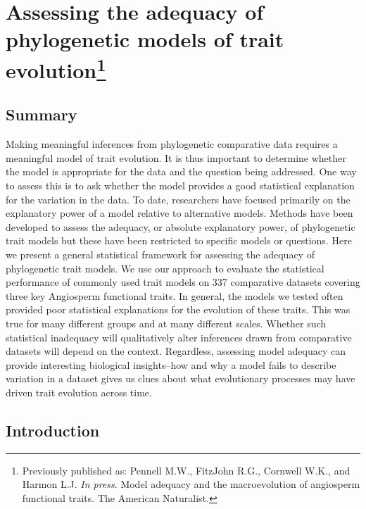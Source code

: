 \chapter[Assessing the adequacy of phylogenetic models of trait evolution]{Assessing the adequacy of phylogenetic models of trait evolution\footnote {Previously published as: Pennell M.W., FitzJohn R.G., Cornwell W.K., and Harmon L.J. \emph{In press}.
  Model adequacy and the macroevolution of angiosperm functional traits.
  The American Naturalist.}}
\label{chap:modeladequacy}

\section{Summary}
Making meaningful inferences from phylogenetic comparative data requires a meaningful model of trait evolution. It is thus important to determine whether the model is appropriate for the data and the question being addressed. One way to assess this is to ask whether the model provides a good statistical explanation for the variation in the data. To date, researchers have focused primarily on the explanatory power of a model relative to alternative models. Methods have been developed to assess the adequacy, or absolute explanatory power, of phylogenetic trait models but these have been restricted to specific models or questions. Here we present a general statistical framework for assessing the adequacy of phylogenetic trait models. We use our approach to evaluate the statistical performance of commonly used trait models on 337 comparative datasets covering three key Angiosperm functional traits. In general, the models we tested often provided poor statistical explanations for the evolution of these traits. This was true for many different groups and at many different scales. Whether such statistical inadequacy will qualitatively alter inferences drawn from comparative datasets will depend on the context. Regardless, assessing model adequacy can provide interesting biological insights--how and why a model fails to describe variation in a dataset gives us clues about what evolutionary processes may have driven trait evolution across time.

\section{Introduction}


